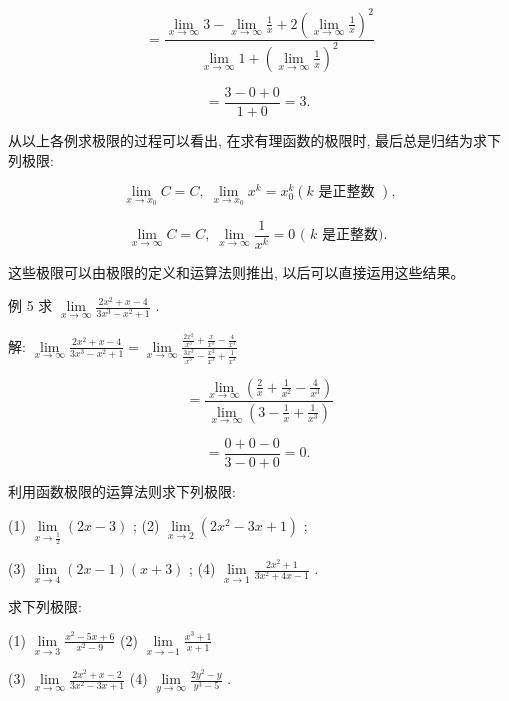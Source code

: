 \documentclass[lang=cn,newtx,12pt,scheme=chinese]{elegantbook}
\begin{document}
\[
= \frac{\mathop{\lim }\limits_{{x \rightarrow \infty }}3 - \mathop{\lim }\limits_{{x \rightarrow \infty }}\frac{1}{x} + 2{\left( \mathop{\lim }\limits_{{x \rightarrow \infty }}\frac{1}{x}\right) }^{2}}{\mathop{\lim }\limits_{{x \rightarrow \infty }}1 + {\left( \mathop{\lim }\limits_{{x \rightarrow \infty }}\frac{1}{x}\right) }^{2}}
\]

\[
= \frac{3 - 0 + 0}{1 + 0} = 3\text{. }
\]

从以上各例求极限的过程可以看出, 在求有理函数的极限时, 最后总是归结为求下列极限:

\[
\mathop{\lim }\limits_{{x \rightarrow {x}_{0}}}C = C,\;\mathop{\lim }\limits_{{x \rightarrow {x}_{0}}}{x}^{k} = {x}_{0}^{k}\left( {k\text{ 是正整数 }}\right) ,
\]

\[
\mathop{\lim }\limits_{{x \rightarrow \infty }}C = C,\;\mathop{\lim }\limits_{{x \rightarrow \infty }}\frac{1}{{x}^{k}} = 0\text{ ( }k\text{ 是正整数). }
\]

这些极限可以由极限的定义和运算法则推出, 以后可以直接运用这些结果。

例 5 求 \(\mathop{\lim }\limits_{{x \rightarrow \infty }}\frac{2{x}^{2} + x - 4}{3{x}^{3} - {x}^{2} + 1}\) .

解: \(\mathop{\lim }\limits_{{x \rightarrow \infty }}\frac{2{x}^{2} + x - 4}{3{x}^{3} - {x}^{2} + 1} = \mathop{\lim }\limits_{{x \rightarrow \infty }}\frac{\frac{2{x}^{2}}{{x}^{3}} + \frac{x}{{x}^{3}} - \frac{4}{{x}^{3}}}{\frac{3{x}^{3}}{{x}^{3}} - \frac{{x}^{2}}{{x}^{3}} + \frac{1}{{x}^{3}}}\)

\[
= \frac{\mathop{\lim }\limits_{{x \rightarrow \infty }}\left( {\frac{2}{x} + \frac{1}{{x}^{2}} - \frac{4}{{x}^{3}}}\right) }{\mathop{\lim }\limits_{{x \rightarrow \infty }}\left( {3 - \frac{1}{x} + \frac{1}{{x}^{3}}}\right) }
\]

\[
= \frac{0 + 0 - 0}{3 - 0 + 0} = 0\text{. }
\]

\begin{problemset}[练习]
\item 利用函数极限的运算法则求下列极限:

(1) \(\mathop{\lim }\limits_{{x \rightarrow \frac{1}{2}}}\left( {{2x} - 3}\right)\) ; (2) \(\mathop{\lim }\limits_{{x \rightarrow 2}}\left( {2{x}^{2} - {3x} + 1}\right)\) ;

(3) \(\mathop{\lim }\limits_{{x \rightarrow 4}}\left( {{2x} - 1}\right) \left( {x + 3}\right)\) ; (4) \(\mathop{\lim }\limits_{{x \rightarrow 1}}\frac{2{x}^{2} + 1}{3{x}^{2} + {4x} - 1}\) .

\item 求下列极限:

(1) \(\mathop{\lim }\limits_{{x \rightarrow 3}}\frac{{x}^{2} - {5x} + 6}{{x}^{2} - 9}\) (2) \(\mathop{\lim }\limits_{{x \rightarrow - 1}}\frac{{x}^{3} + 1}{x + 1}\)

(3) \(\mathop{\lim }\limits_{{x \rightarrow \infty }}\frac{2{x}^{2} + x - 2}{3{x}^{2} - {3x} + 1}\) (4) \(\mathop{\lim }\limits_{{y \rightarrow \infty }}\frac{2{y}^{2} - y}{{y}^{3} - 5}\) .

\end{problemset}
\end{document}

